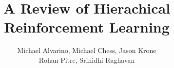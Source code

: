 \documentclass[12pt]{article}
\title{%
\textbf{A Review of Hierachical Reinforcement Learning}
}
\author{
 Michael Alvarino, Michael Chess, Jason Krone\\
 Rohan Pitre, Srinidhi Raghavan \\
}
\begin{document}
\maketitle
\bigskip





















\clearpage




\clearpage
\appendix
\end{document}
